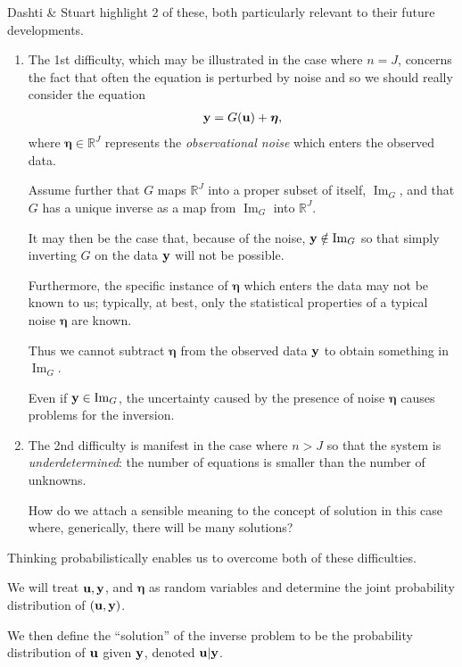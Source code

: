 \documentclass[oneside,11pt]{book}
\numberwithin{equation}{section}
\begin{document}
Dashti \& Stuart highlight 2 of these, both particularly relevant to their future developments.
\begin{enumerate}
    \item The 1st difficulty, which may be illustrated in the case where $n = J$, concerns the fact that often the equation is perturbed by noise and so we should really consider the equation
    \begin{align}
        \label{noise-perturbed equation}
        {\bf y} = G({\bf u}) + \boldsymbol{\eta},
    \end{align}
    where $\boldsymbol{\eta}\in\mathbb{R}^J$ represents the \textit{observational noise} which enters the observed data.
    
    Assume further that $G$ maps $\mathbb{R}^J$ into a proper subset of itself, $\operatorname{Im}_G$, and that $G$ has a unique inverse as a map from $\operatorname{Im}_G$ into $\mathbb{R}^J$.
    
    It may then be the case that, because of the noise, ${\bf y}\notin\operatorname{Im}_G$ so that simply inverting $G$ on the data ${\bf y}$ will not be possible.
    
    Furthermore, the specific instance of $\boldsymbol{\eta}$ which enters the data may not be known to us; typically, at best, only the statistical properties of a typical noise $\boldsymbol{\eta}$ are known.
    
    Thus we cannot subtract $\boldsymbol{\eta}$ from the observed data ${\bf y}$ to obtain something in $\operatorname{Im}_G$.
    
    Even if ${\bf y}\in\operatorname{Im}_G$, the uncertainty caused by the presence of noise $\boldsymbol{\eta}$ causes problems for the inversion.
    \item The 2nd difficulty is manifest in the case where $n > J$ so that the system is \textit{underdetermined}: the number of equations is smaller than the number of unknowns.
    
    How do we attach a sensible meaning to the concept of solution in this case where, generically, there will be many solutions?
\end{enumerate}
Thinking probabilistically enables us to overcome both of these difficulties.

We will treat ${\bf u},{\bf y}$, and $\boldsymbol{\eta}$ as random variables and determine the joint probability distribution of $({\bf u},{\bf y})$.

We then define the ``solution'' of the inverse problem to be the probability distribution of ${\bf u}$ given ${\bf y}$, denoted ${\bf u}|{\bf y}$.
\end{document}
